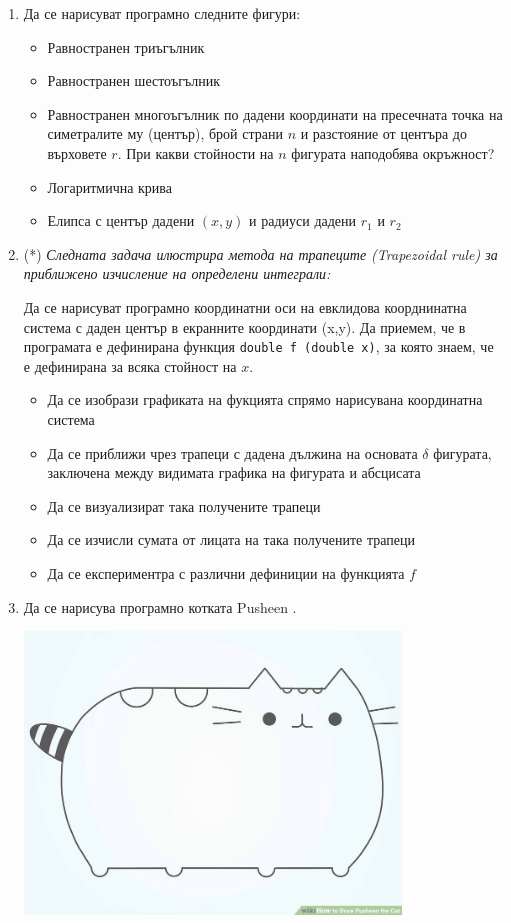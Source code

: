 \documentclass[12pt,a4paper]{article}
\begin{document}
{\begin{enumerate}[resume]
	\item Да се нарисуват програмно следните фигури:

	\begin{itemize}
		\item Равностранен триъгълник
		\item Равностранен шестоъгълник
		\item Равностранен многоъгълник по дадени координати на пресечната точка на симетралите му (център), брой страни $n$ и разстояние от центъра до върховете $r$. При какви стойности на $n$ фигурата наподобява окръжност?
		\item Логаритмична крива
		\item Елипса с център дадени $(x,y)$ и радиуси дадени $r_1$ и $r_2$
	\end{itemize}

	\item(*) \textit{Следната задача илюстрира метода на трапеците (Trapezoidal rule) за приближено изчисление на определени интеграли:}

	Да се нарисуват програмно координатни оси на евклидова коорднинатна система с даден център в екранните координати (x,y). Да приемем, че в програмата е дефинирана функция \texttt {double f (double x)}, за която знаем, че е дефинирана за всяка стойност на $x$.

	\begin{itemize}
		\item Да се изобрази графиката на фукцията спрямо нарисувана координатна система
		\item Да се приближи чрез трапеци с дадена дължина на основата $\delta$ фигурата, заключена между видимата графика на фигурата и абсцисата
		\item Да се визуализират така получените трапеци
		\item Да се изчисли сумата от лицата на така получените трапеци
		\item Да се експериментра с различни дефиниции на функцията $f$
	\end{itemize}

	\item Да се нарисува програмно котката Pusheen \cite{pusheen}.

	\begin{flushleft}
	\includegraphics[width=10cm]{images/pusheen}


\end{flushleft}
\end{enumerate}}
\end{document}
